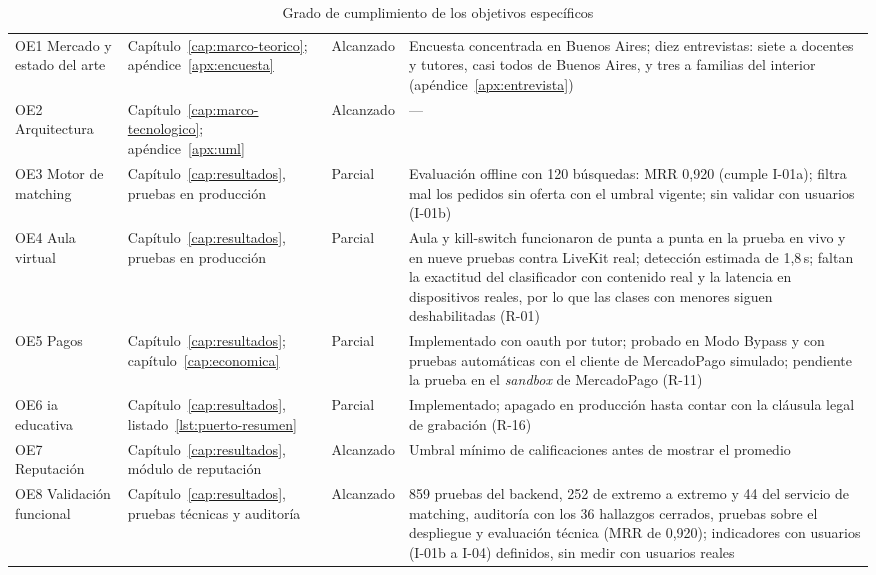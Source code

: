 \begin{table}[H]
    \centering
    \caption{Grado de cumplimiento de los objetivos específicos}
    \label{tab:cumplimiento}
    \small
    \begin{tabularx}{\textwidth}{>{\raggedright\arraybackslash}p{2.6cm} L l L}
        \toprule
         &  &  &  \\
        \midrule
        OE1 Mercado y estado del arte & Capítulo~\ref{cap:marco-teorico}; apéndice~\ref{apx:encuesta} & Alcanzado & Encuesta concentrada en Buenos Aires; diez entrevistas: siete a docentes y tutores, casi todos de Buenos Aires, y tres a familias del interior (apéndice~\ref{apx:entrevista}) \\
        OE2 Arquitectura & Capítulo~\ref{cap:marco-tecnologico}; apéndice~\ref{apx:uml} & Alcanzado & --- \\
        OE3 Motor de \gls{matching} & Capítulo~\ref{cap:resultados}, pruebas en producción & Parcial & Evaluación offline con 120 búsquedas: MRR 0,920 (cumple I-01a); filtra mal los pedidos sin oferta con el umbral vigente; sin validar con usuarios (I-01b) \\
        OE4 Aula virtual & Capítulo~\ref{cap:resultados}, pruebas en producción & Parcial & Aula y kill-switch funcionaron de punta a punta en la prueba en vivo y en nueve pruebas contra LiveKit real; detección estimada de 1,8\,s; faltan la exactitud del clasificador con contenido real y la latencia en dispositivos reales, por lo que las clases con menores siguen deshabilitadas (R-01) \\
        OE5 Pagos & Capítulo~\ref{cap:resultados}; capítulo~\ref{cap:economica} & Parcial & Implementado con \gls{oauth} por tutor; probado en Modo Bypass y con pruebas automáticas con el cliente de MercadoPago simulado; pendiente la prueba en el \emph{sandbox} de MercadoPago (R-11) \\
        OE6 \gls{ia} educativa & Capítulo~\ref{cap:resultados}, listado~\ref{lst:puerto-resumen} & Parcial & Implementado; apagado en producción hasta contar con la cláusula legal de grabación (R-16) \\
        OE7 Reputación & Capítulo~\ref{cap:resultados}, módulo de reputación & Alcanzado & Umbral mínimo de calificaciones antes de mostrar el promedio \\
        OE8 Validación funcional & Capítulo~\ref{cap:resultados}, pruebas técnicas y auditoría & Alcanzado & 859 pruebas del backend, 252 de extremo a extremo y 44 del servicio de \gls{matching}, auditoría con los 36 hallazgos cerrados, pruebas sobre el despliegue y evaluación técnica (MRR de 0,920); indicadores con usuarios (I-01b a I-04) definidos, sin medir con usuarios reales \\
        \bottomrule
    \end{tabularx}
\end{table}

